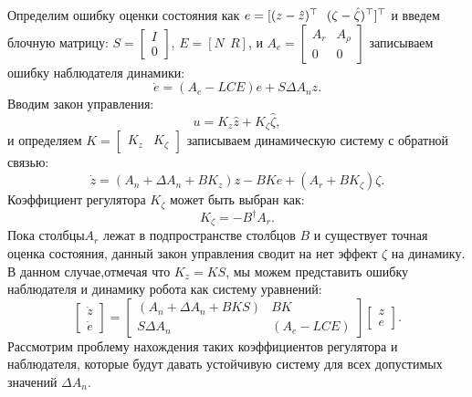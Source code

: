 Определим ошибку оценки состояния как $e = [ (z-\hat{z})^\top \ \ (\zeta-\hat{\zeta})^\top ]^\top$ и введем блочную матрицу:
${S} = \begin{bmatrix}
	{I} \\ 0
\end{bmatrix}$, 
${E}=[ {N} \ \ {R}]$, и 
$
{A}_c=    \begin{bmatrix}
	{A}_r  & {A}_{\rho} \\
	0  & 0
\end{bmatrix}
$
записываем ошибку наблюдателя динамики:
%
\begin{equation}
	\label{eq:part1_error_dynamics}
	\dot e= ({A}_e-{L}{C}{E})e +{S}\Delta {A}_n z.
\end{equation}
%
Вводим закон управления:
%
\begin{equation}
	u={K}_z \hat{z}+{K}_{\zeta} \hat{\zeta},
\end{equation}
%
и определяем ${K}=\begin{bmatrix}
	{K}_z & {K}_{\zeta}
\end{bmatrix}$ записываем динамическую систему с обратной связью:
%
\begin{equation}
	\label{eq:part1_active_dynamics}
	\dot{z}=({A}_n+\Delta {A}_n +{B}{K}_z)z-{B}{K}e+({A}_r+{B}{K}_{\zeta})\zeta.
\end{equation}
%
Коэффициент регулятора ${K}_{\zeta}$ может быть выбран как:
%
\begin{equation}
	\label{eq:part1_static_control}
	{K}_{\zeta}=-{B}^{\dagger}{A}_r.
\end{equation}
%
Пока столбцы${A}_r$ лежат в подпространстве столбцов ${B}$ и существует точная оценка состояния, данный закон управления сводит на нет эффект $\zeta$ на динамику. В данном случае,отмечая что ${K}_z={K}{S}$,  мы можем представить ошибку наблюдателя и динамику робота как систему уравнений:
%
\begin{equation}
	\label{eq:part1_system}
	\begin{bmatrix}
		\dot{z} \\ \dot{e}
	\end{bmatrix}=\begin{bmatrix}
		({A}_n+\Delta {A}_n +{B}{K}{S}) & {B}{K} \\
		{S} \Delta {A}_n & ({A}_e-{L}{C}{E})        \end{bmatrix}\begin{bmatrix}
		z \\ e
	\end{bmatrix}.
\end{equation}
%
Рассмотрим проблему нахождения таких коэффициентов регулятора и наблюдателя, которые будут давать устойчивую систему для всех допустимых значений $\Delta {A}_n$.
\clearpage
